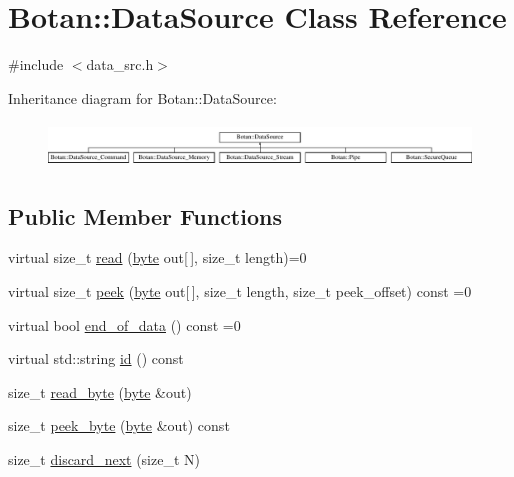\hypertarget{classBotan_1_1DataSource}{\section{Botan\-:\-:Data\-Source Class Reference}
\label{classBotan_1_1DataSource}
}


{\ttfamily \#include $<$data\-\_\-src.\-h$>$}

Inheritance diagram for Botan\-:\-:Data\-Source\-:\begin{figure}[H]
\begin{center}
\leavevmode
\includegraphics[height=1.197861cm]{classBotan_1_1DataSource}
\end{center}
\end{figure}
\subsection*{Public Member Functions}
\begin{DoxyCompactItemize}
\item 
virtual size\-\_\-t \hyperlink{classBotan_1_1DataSource_a6dd56e27187fd78447445b00a1eace10}{read} (\hyperlink{namespaceBotan_a7d793989d801281df48c6b19616b8b84}{byte} out\mbox{[}$\,$\mbox{]}, size\-\_\-t length)=0
\item 
virtual size\-\_\-t \hyperlink{classBotan_1_1DataSource_a705621d58788cffbd187067aefddb611}{peek} (\hyperlink{namespaceBotan_a7d793989d801281df48c6b19616b8b84}{byte} out\mbox{[}$\,$\mbox{]}, size\-\_\-t length, size\-\_\-t peek\-\_\-offset) const =0
\item 
virtual bool \hyperlink{classBotan_1_1DataSource_ad9a325f928edd0f7e5eb937da46630d1}{end\-\_\-of\-\_\-data} () const =0
\item 
virtual std\-::string \hyperlink{classBotan_1_1DataSource_a306147a28e70e2c8d8ef06bc3f94755a}{id} () const 
\item 
size\-\_\-t \hyperlink{classBotan_1_1DataSource_ad0add16e53701e7df985be1788276d3a}{read\-\_\-byte} (\hyperlink{namespaceBotan_a7d793989d801281df48c6b19616b8b84}{byte} \&out)
\item 
size\-\_\-t \hyperlink{classBotan_1_1DataSource_a1c9422af7c23b2be8ebc8de99863a743}{peek\-\_\-byte} (\hyperlink{namespaceBotan_a7d793989d801281df48c6b19616b8b84}{byte} \&out) const 
\item 
size\-\_\-t \hyperlink{classBotan_1_1DataSource_a8c39cb51e7f98e500c35eddf529d5ad9}{discard\-\_\-next} (size\-\_\-t N)
\end{DoxyCompactItemize}


